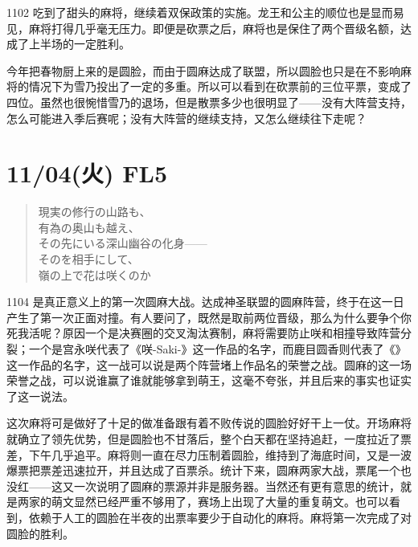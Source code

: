 1102 吃到了甜头的麻将，继续着双保政策的实施。龙王和公主的顺位也是显而易见，麻将打得几乎毫无压力。即便是砍票之后，麻将也是保住了两个晋级名额，达成了上半场的一定胜利。

今年把春物厨上来的是圆脸，而由于圆麻达成了联盟，所以圆脸也只是在不影响麻将的情况下为雪乃投出了一定的多重。所以可以看到在砍票前的三位平票，变成了四位。虽然也很惋惜雪乃的退场，但是散票多少也很明显了——没有大阵营支持，怎么可能进入季后赛呢；没有大阵营的继续支持，又怎么继续往下走呢？

\section{11/04(火) FL5}

\begin{quote}\kasho
現実の修行の山路も、\\
有為の奥山も越え、\\
その先にいる深山幽谷の化身——\\
そのを相手にして、\\
嶺の上で花は咲くのか
\end{quote}

1104 是真正意义上的第一次圆麻大战。达成神圣联盟的圆麻阵营，终于在这一日产生了第一次正面对撞。有人要问了，既然是取前两位晋级，那么为什么要争个你死我活呢？原因一个是决赛圈的交叉淘汰赛制，麻将需要防止咲和相撞导致阵营分裂；一个是宫永咲代表了《咲-Saki-》这一作品的名字，而鹿目圆香则代表了《\Mado》这一作品的名字，这一战可以说是两个阵营堵上作品名的荣誉之战。圆麻的这一场荣誉之战，可以说谁赢了谁就能够拿到萌王，这毫不夸张，并且后来的事实也证实了这一说法。

这次麻将可是做好了十足的做准备跟有着不败传说的圆脸好好干上一仗。开场麻将就确立了领先优势，但是圆脸也不甘落后，整个白天都在坚持追赶，一度拉近了票差，下午几乎追平。麻将则一直在尽力压制着圆脸，维持到了海底时间，又是一波爆票把票差迅速拉开，并且达成了百票杀。统计下来，圆麻两家大战，票尾一个也没红——这又一次说明了圆麻的票源并非是服务器。当然还有更有意思的统计，就是两家的萌文显然已经严重不够用了，赛场上出现了大量的重复萌文。也可以看到，依赖于人工的圆脸在半夜的出票率要少于自动化的麻将。麻将第一次完成了对圆脸的胜利。


